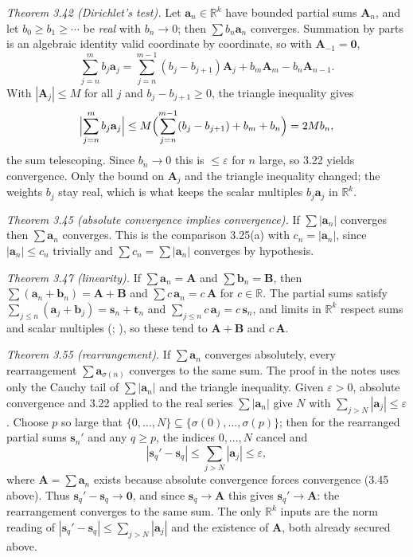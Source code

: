 \documentclass[main.tex]{subfiles}
\begin{document}
\begin{SolutionBlue}
\emph{Theorem 3.42 (Dirichlet's test).} Let $\mathbf a_n\in\mathbb R^k$ have bounded partial sums
$\mathbf A_n$, and let $b_0\ge b_1\ge\cdots$ be \emph{real} with $b_n\to 0$; then $\sum b_n\mathbf a_n$
converges. Summation by parts is an algebraic identity valid coordinate by coordinate, so with
$\mathbf A_{-1}=\mathbf 0$,
\[
\sum_{j=n}^{m}b_j\mathbf a_j
=\sum_{j=n}^{m-1}(b_j-b_{j+1})\mathbf A_j+b_m\mathbf A_m-b_n\mathbf A_{n-1}.
\]
With $|\mathbf A_j|\le M$ for all $j$ and $b_j-b_{j+1}\ge 0$, the triangle inequality gives
\[
\Bigl|\sum_{j=n}^{m}b_j\mathbf a_j\Bigr|
\le M\Bigl(\sum_{j=n}^{m-1}(b_j-b_{j+1})+b_m+b_n\Bigr)=2Mb_n,
\]
the sum telescoping. Since $b_n\to 0$ this is $\le\varepsilon$ for $n$ large, so 3.22 yields
convergence. Only the bound on $\mathbf A_j$ and the triangle inequality changed; the weights $b_j$ stay
real, which is what keeps the scalar multiples $b_j\mathbf a_j$ in $\mathbb R^k$.

\emph{Theorem 3.45 (absolute convergence implies convergence).} If $\sum|\mathbf a_n|$ converges then
$\sum\mathbf a_n$ converges. This is the comparison 3.25(a) with $c_n=|\mathbf a_n|$, since $|\mathbf
a_n|\le c_n$ trivially and $\sum c_n=\sum|\mathbf a_n|$ converges by hypothesis.

\emph{Theorem 3.47 (linearity).} If $\sum\mathbf a_n=\mathbf A$ and $\sum\mathbf b_n=\mathbf B$, then
$\sum(\mathbf a_n+\mathbf b_n)=\mathbf A+\mathbf B$ and $\sum c\,\mathbf a_n=c\,\mathbf A$ for $c\in\mathbb
R$. The partial sums satisfy $\sum_{j\le n}(\mathbf a_j+\mathbf b_j)=\mathbf s_n+\mathbf t_n$ and
$\sum_{j\le n}c\,\mathbf a_j=c\,\mathbf s_n$, and limits in $\mathbb R^k$ respect sums and scalar
multiples (; ), so these tend to $\mathbf
A+\mathbf B$ and $c\,\mathbf A$.

\emph{Theorem 3.55 (rearrangement).} If $\sum\mathbf a_n$ converges absolutely, every rearrangement
$\sum\mathbf a_{\sigma(n)}$ converges to the same sum. The proof in the notes uses only the Cauchy tail
of $\sum|\mathbf a_n|$ and the triangle inequality. Given $\varepsilon>0$, absolute convergence and 3.22
applied to the real series $\sum|\mathbf a_n|$ give $N$ with $\sum_{j>N}|\mathbf a_j|\le\varepsilon$.
Choose $p$ so large that $\{0,\dots,N\}\subseteq\{\sigma(0),\dots,\sigma(p)\}$; then for the rearranged
partial sums $\mathbf s_n'$ and any $q\ge p$, the indices $0,\dots,N$ cancel and
\[
|\mathbf s_q'-\mathbf s_q|\le\sum_{j>N}|\mathbf a_j|\le\varepsilon,
\]
where $\mathbf A=\sum\mathbf a_n$ exists because absolute convergence forces convergence (3.45 above).
Thus $\mathbf s_q'-\mathbf s_q\to\mathbf 0$, and since $\mathbf s_q\to\mathbf A$ this gives $\mathbf
s_q'\to\mathbf A$: the rearrangement converges to the same sum. The only $\mathbb R^k$ inputs are the
norm reading of $|\mathbf s_q'-\mathbf s_q|\le\sum_{j>N}|\mathbf a_j|$ and the existence of $\mathbf A$,
both already secured above.


\end{SolutionBlue}
\end{document}
